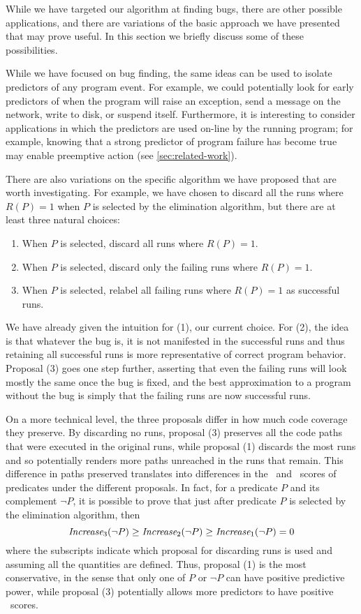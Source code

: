 While we have targeted our algorithm at finding bugs, there are other
possible applications, and there are variations of the basic approach
we have presented that may prove useful.  In this section we briefly
discuss some of these possibilities.

While we have focused on bug finding, the same ideas
can be used to isolate predictors of any program event.  For example,
we could potentially look for early predictors of when the program
will raise an exception, send a message on the network, write to disk,
or suspend itself.  Furthermore, it is interesting to consider
applications in which the predictors are used on-line by the running
program; for example, knowing that a strong predictor of program
failure has become true may enable preemptive action (see
\autoref{sec:related-work}).

There are also variations on the specific algorithm we have proposed
that are worth investigating.  For example, we have chosen to discard
all the runs where $R(P) = 1$ when $P$ is selected by the
elimination algorithm, but there are at least three natural choices:
\begin{enumerate}
\item When $P$ is selected, discard all runs where $R(P) = 1$.

\item When $P$ is selected, discard only the failing runs where $R(P) = 1$.

\item When $P$ is selected, relabel all failing runs where $R(P) = 1$ as successful runs.
\end{enumerate}

We have already given the intuition for (1), our current choice.  For
(2), the idea is that whatever the bug is, it is not manifested in the
successful runs and thus retaining all successful runs is more
representative of correct program behavior.  Proposal (3) goes one step
further, asserting that even the failing runs will look mostly the same
once the bug is fixed, and the best approximation to a program without the
bug is simply that the failing runs are now successful runs.

On a more technical level, the three proposals differ in how much code
coverage they preserve.  By discarding no runs, proposal (3) preserves
all the code paths that were executed in the original
runs, while proposal (1) discards the most runs and so
potentially renders more paths unreached in the runs that
remain.  This difference in paths preserved translates into differences
in the \crash\ and \context\ scores of predicates under the different proposals.
In fact, for a predicate $P$ and its complement $\neg P$, it is
possible to prove that just after predicate $P$ is selected by the
elimination algorithm, then 
\[ \textit{Increase}_3(\neg P) \geq \textit{Increase}_2(\neg P) \geq \textit{Increase}_1(\neg P) = 0 \]
where the subscripts indicate which proposal for discarding runs is used
and assuming all the quantities are defined.  Thus, proposal (1) is the
most conservative, in the sense that only one of $P$ or $\neg P$ can
have positive predictive power, while proposal (3) potentially allows
more predictors to have positive \increase\ scores.  

